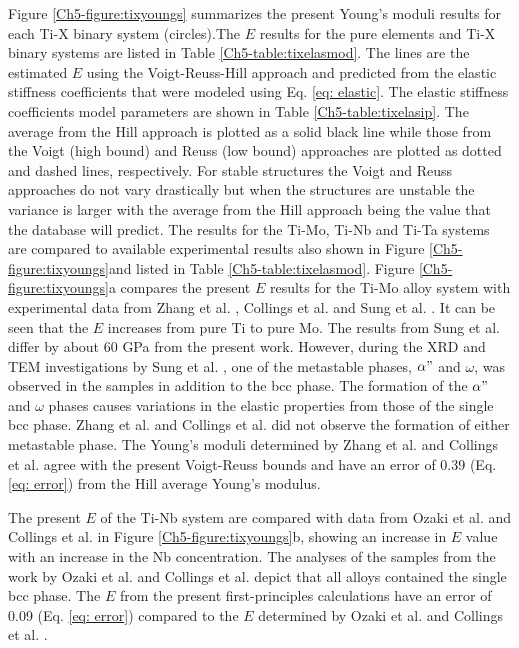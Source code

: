 Figure \ref{Ch5-figure:tixyoungs} summarizes the present Young's moduli results for each Ti-X binary system (circles).The $E$ results for the pure elements and Ti-X binary systems are listed in Table \ref{Ch5-table:tixelasmod}. The lines are the estimated $E$ using the Voigt-Reuss-Hill approach and predicted from the elastic stiffness coefficients that were modeled using Eq. \ref{eq: elastic}. The elastic stiffness coefficients model parameters are shown in Table \ref{Ch5-table:tixelasip}. The average from the Hill approach is plotted as a solid black line while those from the Voigt (high bound) and Reuss (low bound) approaches are plotted as dotted and dashed lines, respectively. For stable structures the Voigt and Reuss approaches do not vary drastically but when the structures are unstable the variance is larger with the average from the Hill approach being the value that the database will predict. The results for the Ti-Mo, Ti-Nb and Ti-Ta systems are compared to available experimental results \cite{Zhang2015,Boyer1994,Sung2015,Ozaki2004,Fedotov1985,Zhou2009a,Zhou2004a} also shown in Figure \ref{Ch5-figure:tixyoungs}and listed in Table \ref{Ch5-table:tixelasmod}. Figure \ref{Ch5-figure:tixyoungs}a compares the present $E$ results for the Ti-Mo alloy system with experimental data from Zhang et al. \cite{Zhang2015}, Collings et al. \cite{Boyer1994} and Sung et al. \cite{Sung2015}. It can be seen that the $E$ increases from pure Ti to pure Mo. The results from Sung et al. \cite{Sung2015} differ by about 60 GPa from the present work. However, during the XRD and TEM investigations by Sung et al. \cite{Sung2015}, one of the metastable phases, $\alpha"$ and $\omega$, was observed in the samples in addition to the bcc phase. The formation of the $\alpha"$ and $\omega$ phases causes variations in the elastic properties from those of the single bcc phase. Zhang et al. \cite{Zhang2015} and Collings et al. \cite{Boyer1994} did not observe the formation of either metastable phase. The Young's moduli determined by Zhang et al. \cite{Zhang2015} and Collings et al. \cite{Boyer1994} agree with the present Voigt-Reuss bounds and have an error of 0.39 (Eq. \ref{eq: error}) from the Hill average Young's modulus. 

The present $E$ of the Ti-Nb system are compared with data from Ozaki et al. \cite{Ozaki2004} and Collings et al. \cite{Boyer1994} in Figure \ref{Ch5-figure:tixyoungs}b, showing an increase in $E$ value with an increase in the Nb concentration. The analyses of the samples from the work by Ozaki et al. \cite{Ozaki2004} and Collings et al. \cite{Boyer1994} depict that all alloys contained the single bcc phase. The $E$ from the present first-principles calculations have an error of 0.09 (Eq. \ref{eq: error}) compared to the $E$ determined by Ozaki et al. \cite{Ozaki2004} and Collings et al. \cite{Boyer1994}. 

